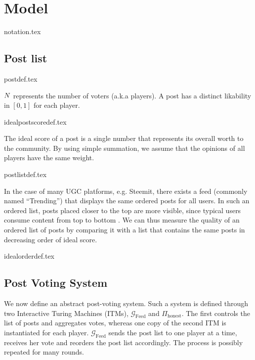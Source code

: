 \section{Model}
  {notation.tex}

  \subsection{Post list}
    {postdef.tex}

    \noindent $N$ represents the number of voters (a.k.a players). A
    post has a distinct likability in $\left[0, 1\right]$ for each player.

    {idealpostscoredef.tex}

    \noindent The ideal score of a post is a single number that represents its
    overall worth to the community. By using simple summation, we assume that
    the opinions of all players have the same weight.

    {postlistdef.tex}

    \noindent In the case of many UGC platforms, e.g. Steemit, there exists a
    feed (commonly named ``Trending'') that displays the same ordered posts for
    all users. In such an ordered list, posts placed closer to the top are more
    visible, since typical users consume content from top to bottom
    . We can thus measure the quality of an
    ordered list of posts by comparing it with a list that contains the same
    posts in decreasing order of ideal score.

    {idealorderdef.tex}

  \subsection{Post Voting System}
    We now define an abstract post-voting system. Such a system is defined
    through two Interactive Turing Machines (ITMs),
    $\mathcal{G}_{\mathrm{Feed}}$ and $\Pi_{\mathrm{honest}}$. The first
    controls the list of posts and aggregates votes, whereas one copy of the
    second ITM is instantiated for each player. $\mathcal{G}_{\mathrm{Feed}}$
    sends the post list to one player at a time, receives her vote and reorders
    the post list accordingly. The process is possibly repeated for many rounds.

